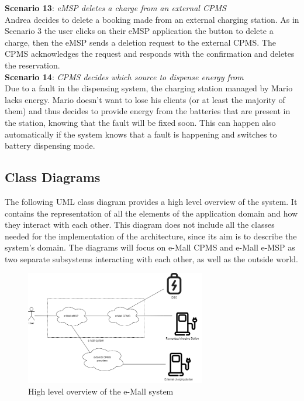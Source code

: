 \documentclass[12pt]{report}
\begin{document}
\textbf{Scenario 13}: \emph{eMSP deletes a charge from an external CPMS}\\
    Andrea decides to delete a booking made from an external charging station. As in Scenario 3 the user clicks on their eMSP application the button to delete a charge, then the eMSP sends a deletion request to the external CPMS. The CPMS acknowledges the request and responds with the confirmation and deletes the reservation.\\
 

\textbf{Scenario 14}: \emph{CPMS decides which source to dispense energy from}\\
    Due to a fault in the dispensing system, the charging station managed by Mario lacks energy. Mario doesn’t want to lose his clients (or at least the majority of them) and thus decides to provide energy from the batteries that  are present in the station, knowing that the fault will be fixed soon. This can happen also automatically if the system knows that a fault is happening and switches to battery dispensing mode.\\

\bigskip
 
\subsection{Class Diagrams}
The following UML class diagram provides a high level overview of the system. It contains the representation of all the elements of the application domain and how they interact with each other. This diagram does not include all the classes needed for the implementation of the architecture, since its aim is to describe the system’s domain. The diagrams will focus on e-Mall CPMS and e-Mall e-MSP as two separate subsystems interacting with each other, as well as the outside world.
\begin{figure}[h]
    \centering
    \includegraphics[width=0.70\textwidth]{assets/highest_level_system.drawio.png}
    \caption{High level overview of the e-Mall system}
\end{figure} 
\end{document}
